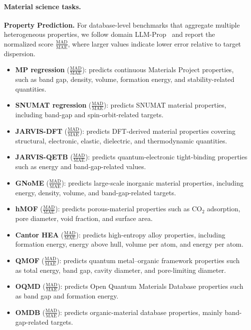 \begin{appendices}
\paragraph{Material science tasks.}
\textbf{Property Prediction.}
For database-level benchmarks that aggregate multiple heterogeneous properties, we follow domain LLM-Prop~\cite{niyongabo2025llm} and report the normalized score \textbf{$\frac{\text{MAD}}{\text{MAE}}$}, where larger values indicate lower error relative to target dispersion. 
\begin{itemize}
    \item \textbf{MP regression} (\textbf{$\frac{\text{MAD}}{\text{MAE}}$}): predicts continuous Materials Project properties, such as band gap, density, volume, formation energy, and stability-related quantities.
    \item \textbf{SNUMAT regression} (\textbf{$\frac{\text{MAD}}{\text{MAE}}$}): predicts SNUMAT material properties, including band-gap and spin-orbit-related targets.
    \item \textbf{JARVIS-DFT} (\textbf{$\frac{\text{MAD}}{\text{MAE}}$}): predicts DFT-derived material properties covering structural, electronic, elastic, dielectric, and thermodynamic quantities.
    \item \textbf{JARVIS-QETB} (\textbf{$\frac{\text{MAD}}{\text{MAE}}$}): predicts quantum-electronic tight-binding properties such as energy and band-gap-related values.
    \item \textbf{GNoME} (\textbf{$\frac{\text{MAD}}{\text{MAE}}$}): predicts large-scale inorganic material properties, including energy, density, volume, and band-gap-related targets.
    \item \textbf{hMOF} (\textbf{$\frac{\text{MAD}}{\text{MAE}}$}): predicts porous-material properties such as CO$_2$ adsorption, pore diameter, void fraction, and surface area.
    \item \textbf{Cantor HEA} (\textbf{$\frac{\text{MAD}}{\text{MAE}}$}): predicts high-entropy alloy properties, including formation energy, energy above hull, volume per atom, and energy per atom.
    \item \textbf{QMOF} (\textbf{$\frac{\text{MAD}}{\text{MAE}}$}): predicts quantum metal--organic framework properties such as total energy, band gap, cavity diameter, and pore-limiting diameter.
    \item \textbf{OQMD} (\textbf{$\frac{\text{MAD}}{\text{MAE}}$}): predicts Open Quantum Materials Database properties such as band gap and formation energy.
    \item \textbf{OMDB} (\textbf{$\frac{\text{MAD}}{\text{MAE}}$}): predicts organic-material database properties, mainly band-gap-related targets.
\end{itemize}


\end{appendices}
